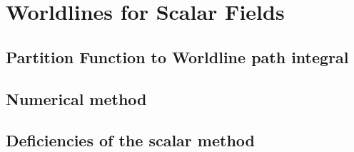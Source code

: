 \chapter{Worldlines for Scalar Fields}
\label{ch:scalar_worldlines}
    \section{Partition Function to Worldline path integral}
    \section{Numerical method}
    \section{Deficiencies of the scalar method}

